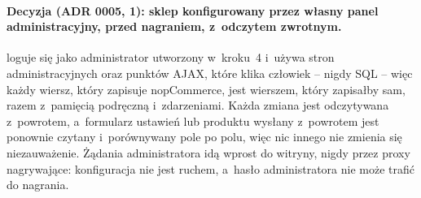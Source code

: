 \paragraph{Decyzja (ADR 0005, 1): sklep konfigurowany przez własny panel
administracyjny, przed nagraniem, z~odczytem zwrotnym.}
 loguje się jako administrator utworzony w~kroku~4
i~używa stron administracyjnych oraz punktów AJAX, które klika człowiek -- nigdy SQL --
więc każdy wiersz, który zapisuje nopCommerce, jest wierszem, który zapisałby sam, razem
z~pamięcią podręczną i~zdarzeniami. Każda zmiana jest odczytywana z~powrotem, a~formularz
ustawień lub produktu wysłany z~powrotem jest ponownie czytany i~porównywany pole po polu,
więc nic innego nie zmienia się niezauważenie. Żądania administratora idą wprost do
witryny, nigdy przez proxy nagrywające: konfiguracja nie jest ruchem, a~hasło
administratora nie może trafić do nagrania.

